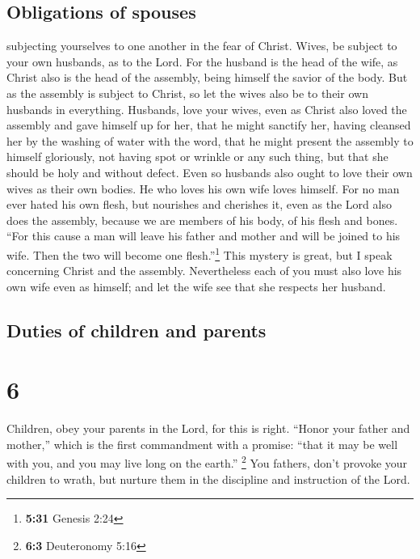 \hypertarget{obligations-of-spouses}{%
\subsection{Obligations of spouses}\label{obligations-of-spouses}}

 subjecting yourselves to one another in the fear of
Christ.  Wives, be subject to your own husbands, as to
the Lord.  For the husband is the head of the wife, as
Christ also is the head of the assembly, being himself the savior of the
body.  But as the assembly is subject to Christ, so let
the wives also be to their own husbands in everything. 
Husbands, love your wives, even as Christ also loved the assembly and
gave himself up for her,  that he might sanctify her,
having cleansed her by the washing of water with the word,
 that he might present the assembly to himself
gloriously, not having spot or wrinkle or any such thing, but that she
should be holy and without defect.  Even so husbands also
ought to love their own wives as their own bodies. He who loves his own
wife loves himself.  For no man ever hated his own flesh,
but nourishes and cherishes it, even as the Lord also does the assembly,
 because we are members of his body, of his flesh and
bones.  ``For this cause a man will leave his father and
mother and will be joined to his wife. Then the two will become one
flesh.''\footnote{\textbf{5:31} Genesis 2:24}  This
mystery is great, but I speak concerning Christ and the assembly.
 Nevertheless each of you must also love his own wife
even as himself; and let the wife see that she respects her husband.

\hypertarget{duties-of-children-and-parents}{%
\subsection{Duties of children and
parents}\label{duties-of-children-and-parents}}

\hypertarget{section-5}{%
\section{6}\label{section-5}}

 Children, obey your parents in the Lord, for this is
right.  ``Honor your father and mother,'' which is the
first commandment with a promise:  ``that it may be well
with you, and you may live long on the earth.'' \footnote{\textbf{6:3}
  Deuteronomy 5:16}  You fathers, don't provoke your
children to wrath, but nurture them in the discipline and instruction of
the Lord.

